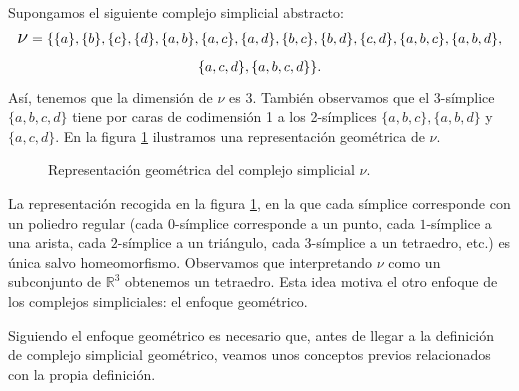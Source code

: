 \documentclass[12pt, a4paper, twoside]{book}
\numberwithin{equation}{section}
\theoremstyle{definition}
\newenvironment{ejem}
  {\pushQED{\qed}\renewcommand{\qedsymbol}{$\blacktriangleleft$}\ejemplo}
  {\popQED\endejemplo}
\theoremstyle{remark}
\theoremstyle{plain}
\begin{document}
	\begin{ejem}
		\label{ejem:1}
		Supongamos el siguiente complejo simplicial abstracto:
		\begin{multline*} 
			\text{{\Large $\nu$}}=\{\{a\},\{b\},\{c\},\{d\},
			\{a,b\},\{a,c\},\{a,d\},\{b,c\},\{b,d\},\{c,d\},
			\{a,b,c\},\{a,b,d\},\\
			\{a,c,d\},\{a,b,c,d\}\}.
		\end{multline*}
		Así, tenemos que la dimensión de {\Large $\nu$} es 3. También 
		observamos que el 3-símplice $\{a,b,c,d\}$ tiene por caras de 
		codimensión 1 a los 2-símplices $\{a,b,c\},\{a,b,d\}$ y 
		$\{a,c,d\}$. En la figura \ref{fig:tetra} ilustramos una 
		representación geométrica de {\Large $\nu$}.

		\begin{figure}[H]
			\centering
			\caption{Representación geométrica del complejo simplicial {\Large $\nu$}.}
			\label{fig:tetra}
		\end{figure}

		La representación recogida en la figura \ref{fig:tetra}, en la
		que cada símplice corresponde con un poliedro regular (cada 
		$0$-símplice corresponde a un punto, cada $1$-símplice a una 
		arista, cada $2$-símplice a un triángulo, cada $3$-símplice a 
		un tetraedro, etc.) es única salvo homeomorfismo. Observamos 
		que interpretando {\Large $\nu$} como un subconjunto de 
		$\mathbb{R}^{3}$ obtenemos un tetraedro. Esta idea motiva el 
		otro enfoque de los complejos simpliciales: el enfoque 
		geométrico.
	\end{ejem}

	Siguiendo el enfoque geométrico es necesario que, antes de llegar a la
	definición de complejo simplicial geométrico, veamos unos conceptos 
	previos relacionados con la propia definición.
\end{document}

